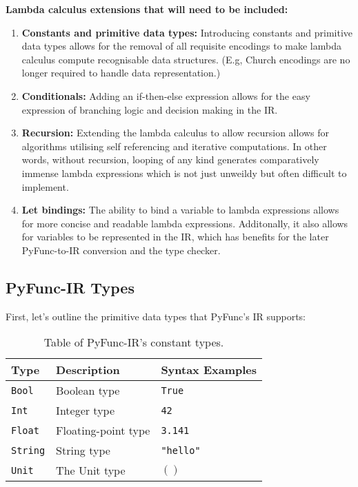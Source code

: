 \documentclass{l4proj}
\begin{document}
\textbf{Lambda calculus extensions that will need to be included:}
\begin{enumerate}
    \item \textbf{Constants and primitive data types:} Introducing constants and primitive data types allows for the removal of all requisite encodings to make lambda calculus compute recognisable data structures. (E.g, Church encodings are no longer required to handle data representation.)
    \item \textbf{Conditionals:} Adding an if-then-else expression allows for the easy expression of branching logic and decision making in the IR.
    \item \textbf{Recursion:} Extending the lambda calculus to allow recursion allows for algorithms utilising self referencing and iterative computations.
    In other words, without recursion, looping of any kind generates comparatively immense lambda expressions which is not just unweildy but often difficult to implement.
    \item \textbf{Let bindings:} The ability to bind a variable to lambda expressions allows for more concise and readable lambda expressions.
    Additonally, it also allows for variables to be represented in the IR, which has benefits for the later PyFunc-to-IR conversion and the type checker. 
\end{enumerate}

\subsection{PyFunc-IR Types}

First, let's outline the primitive data types that PyFunc's IR supports:

\begin{table}[h]
\caption{Table of PyFunc-IR's constant types.}
\label{tab:pyfunc-ir-constants}
\begin{center}
\begin{tabular}{@{}|l|l|l|@{}}
    \hline
    \textbf{Type}        & \textbf{Description}      & \textbf{Syntax Examples}  \\
    \hline
    \texttt{Bool}        & Boolean type              & \texttt{True}       \\
    \texttt{Int}         & Integer type              & \texttt{42}         \\
    \texttt{Float}       & Floating-point type       & \texttt{3.141}      \\
    \texttt{String}      & String type               & \texttt{"hello"}    \\
    \texttt{Unit}        & The Unit type             & \texttt{$()$}       \\ 
    \hline
\end{tabular}
\end{center}
\end{table}
\end{document}
